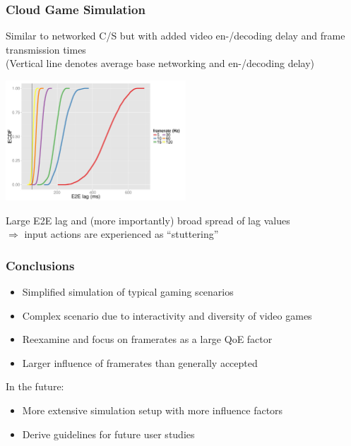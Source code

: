 \documentclass{UDEbeamerEN}
\begin{document}
\begin{frame}
	\frametitle{Cloud Game Simulation}

	\begin{center}
		Similar to networked C/S but with added video en-/decoding delay and frame transmission times\\
		(Vertical line denotes average base networking and en-/decoding delay)

		\includegraphics[height=4.5cm]{../../../simulation/visualization/cloudgaming-lag-cdf.pdf}

		Large E2E lag and (more importantly) broad spread of lag values\\
		$\Rightarrow$ input actions are experienced as ``stuttering''
	\end{center}
\end{frame}




\begin{frame}
	\frametitle{Conclusions}

	\begin{itemize}
		\item Simplified simulation of typical gaming scenarios
		\item Complex scenario due to interactivity and diversity of video games
		\item Reexamine and focus on framerates as a large QoE factor
		\item Larger influence of framerates than generally accepted
	\end{itemize}
	\vspace{1cm}

	\pause
	In the future:
	\begin{itemize}
		\item More extensive simulation setup with more influence factors
		\item Derive guidelines for future user studies
	\end{itemize}
\end{frame}
\end{document}
